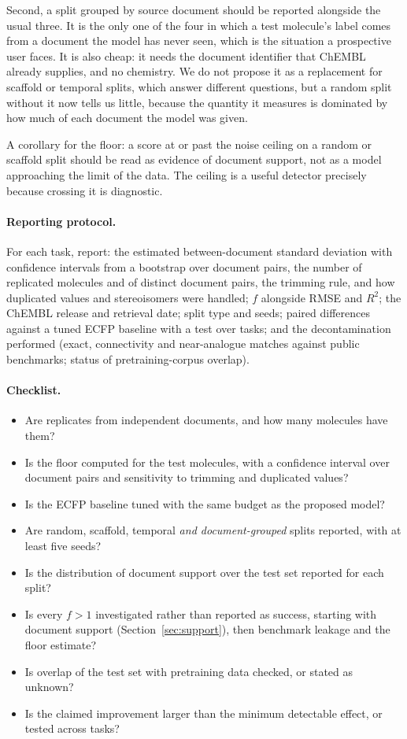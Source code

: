 Second, a split grouped by source document should be reported alongside the usual three. It is the only one of the four in which a test molecule's label comes from a document the model has never seen, which is the situation a prospective user faces. It is also cheap: it needs the document identifier that ChEMBL already supplies, and no chemistry. We do not propose it as a replacement for scaffold or temporal splits, which answer different questions, but a random split without it now tells us little, because the quantity it measures is dominated by how much of each document the model was given.

A corollary for the floor: a score at or past the noise ceiling on a random or scaffold split should be read as evidence of document support, not as a model approaching the limit of the data. The ceiling is a useful detector precisely because crossing it is diagnostic.

\paragraph{Reporting protocol.}
For each task, report: the estimated between-document standard deviation with confidence intervals from a bootstrap over document pairs, the number of replicated molecules and of distinct document pairs, the trimming rule, and how duplicated values and stereoisomers were handled; $f$ alongside RMSE and $R^2$; the ChEMBL release and retrieval date; split type and seeds; paired differences against a tuned ECFP baseline with a test over tasks; and the decontamination performed (exact, connectivity and near-analogue matches against public benchmarks; status of pretraining-corpus overlap).

\paragraph{Checklist.}
\begin{itemize}[nosep]
\item Are replicates from independent documents, and how many molecules have them?
\item Is the floor computed for the test molecules, with a confidence interval over document pairs and sensitivity to trimming and duplicated values?
\item Is the ECFP baseline tuned with the same budget as the proposed model?
\item Are random, scaffold, temporal \emph{and document-grouped} splits reported, with at least five seeds?
\item Is the distribution of document support over the test set reported for each split?
\item Is every $f>1$ investigated rather than reported as success, starting with document support (Section~\ref{sec:support}), then benchmark leakage and the floor estimate?
\item Is overlap of the test set with pretraining data checked, or stated as unknown?
\item Is the claimed improvement larger than the minimum detectable effect, or tested across tasks?
\end{itemize}
